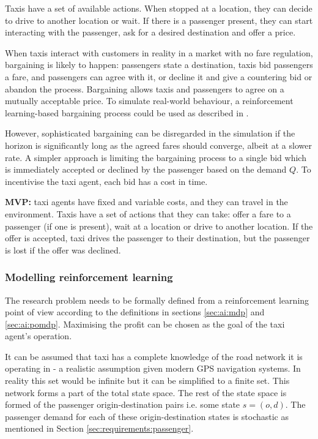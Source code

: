 Taxis have a set of available actions. When stopped at a location, they can
decide to drive to another location or wait. If there is a passenger present,
they can start interacting with the passenger, ask for a desired destination
and offer a price.

When taxis interact with customers in reality in a market with no fare
regulation, bargaining is likely to happen: passengers state a destination,
taxis bid passengers a fare, and passengers can agree with it, or decline it
and give a countering bid or abandon the process. Bargaining allows taxis and
passengers to agree on a mutually acceptable price. To simulate real-world
behaviour, a reinforcement learning-based bargaining process could be used as
described in \textcite{Cli1997taxi+bargaining}.

However, sophisticated bargaining can be disregarded in the simulation if the
horizon is significantly long as the agreed fares should converge, albeit at a
slower rate. A simpler approach is limiting the bargaining process to a single
bid which is immediately accepted or declined by the passenger based on the
demand \(Q\). To incentivise the taxi agent, each bid has a cost in time.

\textbf{MVP:} taxi agents have fixed and variable costs, and they can travel in
the environment. Taxis have a set of actions that they can take: offer a fare
to a passenger (if one is present), wait at a location or drive to another
location. If the offer is accepted, taxi drives the passenger to their
destination, but the passenger is lost if the offer was declined.


\subsubsection{Modelling reinforcement learning}
\label{sec:requirements:ai}

The research problem needs to be formally defined from a reinforcement learning
point of view according to the definitions in sections \ref{sec:ai:mdp} and
\ref{sec:ai:pomdp}. Maximising the profit can be chosen as the goal of the taxi
agent's operation.

It can be assumed that taxi has a complete knowledge of the road network it is
operating in - a realistic assumption given modern GPS navigation systems. In
reality this set would be infinite but it can be simplified to a finite set.
This network forms a part of the total state space. The rest of the state space
is formed of the passenger origin-destination pairs i.e. some state \(s = (o,
d) \). The passenger demand for each of these origin-destination states is
stochastic as mentioned in Section \ref{sec:requirements:passenger}. 

